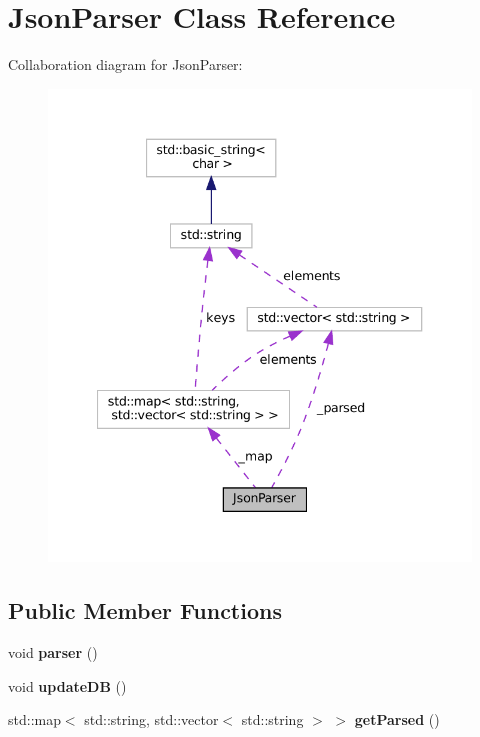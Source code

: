 \hypertarget{classJsonParser}{}\section{Json\+Parser Class Reference}
\label{classJsonParser}


Collaboration diagram for Json\+Parser\+:
\nopagebreak
\begin{figure}[H]
\begin{center}
\leavevmode
\includegraphics[width=340pt]{classJsonParser__coll__graph}
\end{center}
\end{figure}
\subsection*{Public Member Functions}
\begin{DoxyCompactItemize}
\item 
\mbox{\label{classJsonParser_a0596a13bfbe4ad3a3148da5e15d6d5ca}} 
void {\bfseries parser} ()
\item 
\mbox{\label{classJsonParser_a5b1b7ec9ecee0e8e9368341764ceb91a}} 
void {\bfseries update\+DB} ()
\item 
\mbox{\label{classJsonParser_a3edea04b709d78da9b90a916ab1123f6}} 
std\+::map$<$ std\+::string, std\+::vector$<$ std\+::string $>$ $>$ {\bfseries get\+Parsed} ()
\end{DoxyCompactItemize}
